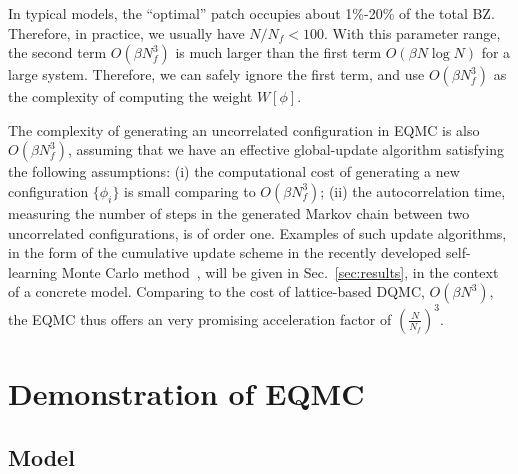 \documentclass[aps,prx,twocolumn,superscriptaddress,showpacs,floatfix]{revtex4-1}
\begin{document}
In typical models, the ``optimal'' patch occupies about 1\%-20\% of the total BZ. Therefore, in practice, we usually have $N/N_f<100$.
With this parameter range, the second term $O(\beta N_f^3)$ is much larger than the first term $O(\beta N\log N)$ for a large system.
Therefore, we can safely ignore the first term, and use $O(\beta N_f^3)$ as the complexity of computing the weight $W[\phi]$.


The complexity of generating an uncorrelated configuration in EQMC is also $O(\beta N_f^3)$,
assuming that we have an effective global-update algorithm satisfying the following assumptions:
(i) the computational cost of generating a new configuration $\{\phi_i\}$ is small comparing to $O(\beta N_f^3)$;
(ii) the autocorrelation time, measuring the number of steps in the generated Markov chain between two uncorrelated configurations, is of order one.
Examples of such update algorithms, in the form of the cumulative update scheme in the recently developed self-learning Monte Carlo method~\cite{liu2016fermion,Xu2016self}, will be given in Sec.~\ref{sec:results}, in the context of a concrete model.
Comparing to the cost of lattice-based DQMC, $O(\beta N^3)$, the EQMC thus offers an  very promising acceleration factor of $(\frac{N}{N_f})^3$.


\section{Demonstration of EQMC}
\label{sec:demo}

\subsection{Model}
\label{sec:model}
\end{document}
